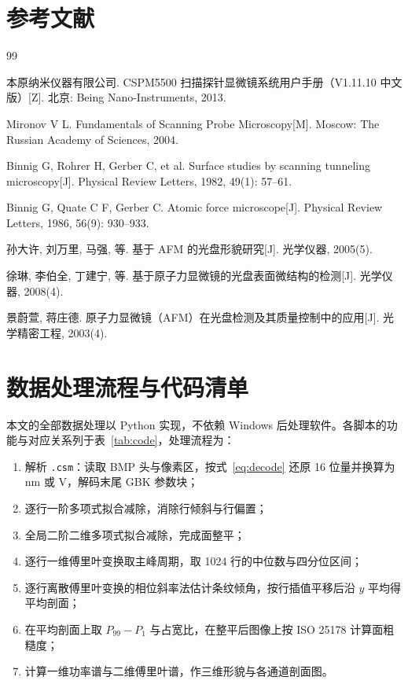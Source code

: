 \section{参考文献}
\renewcommand{\refname}{}
\songti{}
\begin{thebibliography}{99}

本原纳米仪器有限公司. CSPM5500 扫描探针显微镜系统用户手册（V1.11.10 中文版）[Z]. 北京: Being Nano-Instruments, 2013.

Mironov V L. Fundamentals of Scanning Probe Microscopy[M]. Moscow: The Russian Academy of Sciences, 2004.

Binnig G, Rohrer H, Gerber C, et al. Surface studies by scanning tunneling microscopy[J]. Physical Review Letters, 1982, 49(1): 57--61.

Binnig G, Quate C F, Gerber C. Atomic force microscope[J]. Physical Review Letters, 1986, 56(9): 930--933.

孙大许, 刘万里, 马强, 等. 基于 AFM 的光盘形貌研究[J]. 光学仪器, 2005(5).

徐琳, 李伯全, 丁建宁, 等. 基于原子力显微镜的光盘表面微结构的检测[J]. 光学仪器, 2008(4).

景蔚萱, 蒋庄德. 原子力显微镜（AFM）在光盘检测及其质量控制中的应用[J]. 光学精密工程, 2003(4).

\end{thebibliography}

\newpage
\appendix
\section{数据处理流程与代码清单}

本文的全部数据处理以 Python 实现，不依赖 Windows 后处理软件。各脚本的功能与对应关系列于表~\ref{tab:code}，处理流程为：

\begin{enumerate}
  \item 解析 \texttt{.csm}：读取 BMP 头与像素区，按式~\eqref{eq:decode} 还原 16 位量并换算为 nm 或 V，解码末尾 GBK 参数块；
  \item 逐行一阶多项式拟合减除，消除行倾斜与行偏置；
  \item 全局二阶二维多项式拟合减除，完成面整平；
  \item 逐行一维傅里叶变换取主峰周期，取 1024 行的中位数与四分位区间；
  \item 逐行离散傅里叶变换的相位斜率法估计条纹倾角，按行插值平移后沿 $y$ 平均得平均剖面；
  \item 在平均剖面上取 $P_{99}-P_1$ 与占宽比，在整平后图像上按 ISO 25178 计算面粗糙度；
  \item 计算一维功率谱与二维傅里叶谱，作三维形貌与各通道剖面图。
\end{enumerate}

